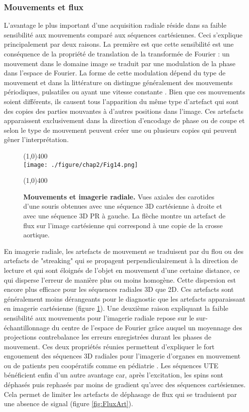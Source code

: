 \subsubsection{Mouvements et flux}
\label{subsec:MouvEtFlux}
L'avantage le plus important d'une acquisition radiale réside dans sa faible sensibilité aux mouvements comparé aux séquences cartésiennes. Ceci s'explique principalement par deux raisons. La première est que cette sensibilité est une conséquence de la propriété de translation de la transformée de Fourier : un mouvement dans le domaine image se traduit par une modulation de la phase dans l'espace de Fourier. La forme de cette modulation dépend du type de mouvement et dans la littérature on distingue généralement des mouvements périodiques, pulsatiles ou ayant une vitesse constante \cite{Glover1991Phase-offset-mu}. Bien que ces mouvements soient différents, ils causent tous l'apparition du même type d'artefact qui sont des copies des parties mouvantes à d'autres positions dans l'image. Ces artefacts apparaissent exclusivement dans la direction d'encodage de phase ou de coupe et selon le type de mouvement peuvent créer une ou plusieurs copies qui peuvent gêner l'interprétation. 

\begin{figure}[h]
\centering
\line(1,0){400} \\
\texttt{[image: ./figure/chap2/Fig14.png]}
\caption[Mouvements et imagerie radiale.]{\label{fig:MotionArt} \textbf{Mouvements et imagerie radiale.} Vues axiales des carotides d'une souris obtenues avec une séquence 3D cartésienne à droite et avec une séquence 3D PR à gauche. La flèche montre un artefact de flux sur l'image cartésienne qui correspond à une copie de la crosse aortique.}
\line(1,0){400} \\
\end{figure}

En imagerie radiale, les artefacts de mouvement se traduisent par du flou ou des artefacts de "streaking" qui se propagent perpendiculairement à la direction de lecture et qui sont éloignés de l'objet en mouvement d'une certaine distance, ce qui disperse l'erreur de manière plus ou moins homogène. Cette dispersion est encore plus efficace pour les séquences radiales 3D que 2D. Ces artefacts sont généralement moins dérangeants pour le diagnostic que les artefacts apparaissant en imagerie cartésienne (figure \ref{fig:MotionArt}).
Une deuxième raison expliquant la faible sensibilité aux mouvements pour l'imagerie radiale repose sur le sur-échantillonnage du centre de l'espace de Fourier grâce auquel un moyennage des projections contrebalance les erreurs enregistrées durant les phases de mouvement.
Ces deux propriétés réunies permettent d'expliquer le fort engouement des séquences 3D radiales pour l'imagerie d'organes en mouvement ou de patients peu coopératifs comme en pédiatrie \cite{block2014towards,Nayak:2014aa}.
Les séquences UTE bénéficient enfin d'un autre avantage car, après l'excitation, les spins sont déphasés puis rephasés par moins de gradient qu'avec des séquences cartésiennes. Cela permet de limiter les artefacts de déphasage de flux qui se traduisent par une absence de signal (figure \ref{fig:FluxArt}).

